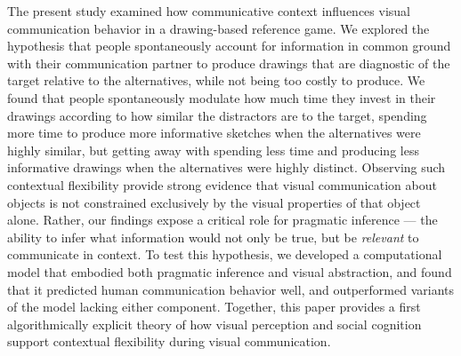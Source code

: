 \documentclass[9pt,twocolumn,twoside]{pnas-new}
\begin{document}
The present study examined how communicative context influences visual communication behavior in a drawing-based reference game. 
We explored the hypothesis that people spontaneously account for information in common ground with their communication partner to produce drawings that are diagnostic of the target relative to the alternatives, while not being too costly to produce. 
We found that people spontaneously modulate how much time they invest in their drawings according to how similar the distractors are to the target, spending more time to produce more informative sketches when the alternatives were highly similar, but getting away with spending less time and producing less informative drawings when the alternatives were highly distinct.
Observing such contextual flexibility provide strong evidence that visual communication about objects is not constrained exclusively by the visual properties of that object alone.  
Rather, our findings expose a critical role for pragmatic inference --- the ability to infer what information would not only be true, but be \textit{relevant} to communicate in context.
To test this hypothesis, we developed a computational model that embodied both pragmatic inference and visual abstraction, and found that it predicted human communication behavior well, and outperformed variants of the model lacking either component. 
Together, this paper provides a first algorithmically explicit theory of how visual perception and social cognition support contextual flexibility during visual communication.
\end{document}
